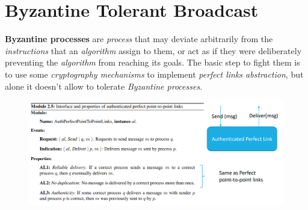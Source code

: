 \documentclass{article}
\begin{document}
\section{Byzantine Tolerant Broadcast}
\textbf{Byzantine processes} are \emph{process} that may deviate arbitrarily from the \emph{instructions} that an \emph{algorithm} assign to them, or act as if they were deliberately preventing the \emph{algorithm} from reaching its goals. The basic step to fight them is to use some \emph{cryptography mechanisms} to implement \emph{perfect links abstraction}, but alone it doesn't allow to tolerate \emph{Byzantine processes}. 
\begin{figure}[H]
  \centering
  \includegraphics[scale=0.8]{cattura79.png}
\end{figure}
\end{document}
